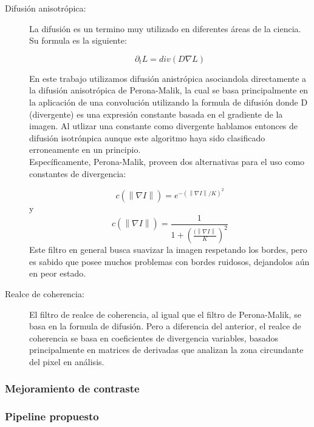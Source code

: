 \begin{description}
  \item[Difusi\'on anisotr\'opica:] La difusi\'on es un termino muy utilizado en diferentes \'areas de la ciencia. Su formula es la siguiente:
  
  \begin{displaymath}
  	\partial_tL=div(D\nabla L)    
  \end{displaymath} 
  
  En este trabajo utilizamos difusi\'on anistr\'opica asociandola directamente a la difusi\'on anisotr\'opica de Perona-Malik, la cual se basa principalmente en la aplicaci\'on de una convoluci\'on utilizando la formula de difusi\'on donde D (divergente) es una expresi\'on constante basada en el gradiente de la imagen. Al utlizar una constante como divergente hablamos entonces de difusi\'on isotr\'onpica aunque este algoritmo haya sido clasificado erroneamente en un principio. \\
  Espec\'ificamente, Perona-Malik, proveen dos alternativas para el uso como constantes de divergencia:
  
  \begin{displaymath}
  	c(\left\|\nabla I\right\|)=e^{-(\left\|\nabla I\right\|/K)^2}  
  \end{displaymath}   
  y
  \begin{displaymath}
  	c(\left\|\nabla I\right\|)=\frac1{1+({\displaystyle\frac{(\left\|\nabla I\right\|}K})^2}
  \end{displaymath}
  Este filtro en general busca suavizar la imagen respetando los bordes, pero es sabido que posee muchos problemas con bordes ruidosos, dejandolos a\'un en peor estado.
  
  \item[Realce de coherencia:] El filtro de realce de coherencia, al igual que el filtro de Perona-Malik, se basa en la formula de difusi\'on. Pero a diferencia del anterior, el realce de coherencia se basa en coeficientes de divergencia variables, basados principalmente en matrices de derivadas que analizan la zona circundante del pixel en an\'alisis.
\end{description}

\subsubsection{Mejoramiento de contraste}


\subsubsection{Pipeline propuesto}


